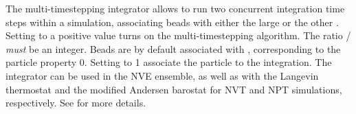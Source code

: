 The multi-timestepping integrator allows to run two concurrent integration time
steps within a simulation, associating beads with either the large
 or the other .  Setting
 to a positive value turns on the multi-timestepping
algorithm.  The ratio / \emph{must} be
an integer.  Beads are by default associated with ,
corresponding to the particle property  0.  Setting
 to 1 associate the particle to the
 integration.  The integrator can be used in the NVE
ensemble, as well as with the Langevin thermostat and the modified Andersen
barostat for NVT and NPT simulations, respectively.  See \cite{bereau15} for
more details.

